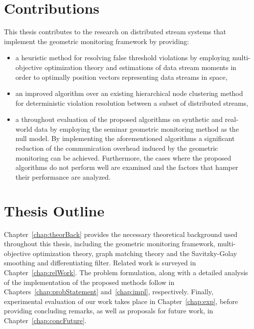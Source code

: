 \section{Contributions} \label{sec:intro-contr}

This thesis contributes to the research on distributed stream systems that implement the geometric monitoring framework by providing:
\begin{itemize}
\item a heuristic method for resolving false threshold violations by employing multi-objective optimization theory and estimations of data stream moments in order to optimally position vectors representing data streams in space,
\item an improved algorithm over an existing hierarchical node clustering method for deterministic violation resolution between a subset of distributed streams,
\item a throughout evaluation of the proposed algorithms on synthetic and real-world data by employing the seminar geometric monitoring method as the null model. By implementing the aforementioned algorithms a significant reduction of the communication overhead induced by the geometric monitoring can be achieved. Furthermore, the cases where the proposed algorithms do not perform well are examined and the factors that hamper their performance are analyzed.
\end{itemize}

\section{Thesis Outline} \label{sec:intro-thesisOutline}

Chapter~\ref{chap:theorBack} provides the necessary theoretical background used throughout this thesis, including the geometric monitoring framework, multi-objective optimization theory, graph matching theory and the Savitzky-Golay smoothing and differentiating filter. Related work is surveyed in Chapter~\ref{chap:relWork}. The problem formulation, along with a detailed analysis of the implementation of the proposed methods follow in Chapters~\ref{chap:probStatement} and~\ref{chap:impl}, respectively. Finally, experimental evaluation of our work takes place in Chapter~\ref{chap:exp}, before providing concluding remarks, as well as proposals for future work, in Chapter~\ref{chap:concFuture}.